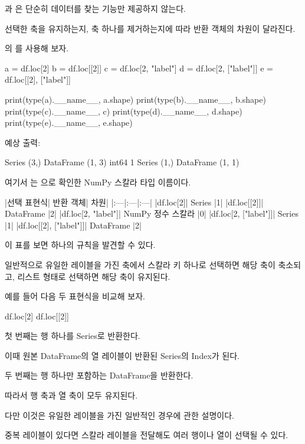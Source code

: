 과 은 단순히 데이터를 찾는 기능만 제공하지 않는다.

선택한 축을 유지하는지, 축 하나를 제거하는지에 따라 반환 객체의 차원이 달라진다.

의 를 사용해 보자.

\begin{dhkcode}
a = df.loc[2]
b = df.loc[[2]]
c = df.loc[2, "label"]
d = df.loc[2, ["label"]]
e = df.loc[[2], ["label"]]

print(type(a).__name__, a.shape)
print(type(b).__name__, b.shape)
print(type(c).__name__, c)
print(type(d).__name__, d.shape)
print(type(e).__name__, e.shape)
\end{dhkcode}

예상 출력:

\begin{dhkzsh}
Series (3,)
DataFrame (1, 3)
int64 1
Series (1,)
DataFrame (1, 1)
\end{dhkzsh}

여기서 는 으로 확인한 NumPy 스칼라 타입 이름이다.

\begin{dhktable}
|선택 표현식|	반환 객체|	차원|
|:---|:---|:---|
|df.loc[2]|	Series	|1|
|df.loc[[2]]|	DataFrame	|2|
|df.loc[2, "label"]|	NumPy 정수 스칼라	|0|
|df.loc[2, ["label"]]|	Series	|1|
|df.loc[[2], ["label"]]|	DataFrame	|2|
\end{dhktable}

이 표를 보면 하나의 규칙을 발견할 수 있다.

일반적으로 유일한 레이블을 가진 축에서 스칼라 키 하나로 선택하면 해당 축이 축소되고, 리스트 형태로 선택하면 해당 축이 유지된다.

예를 들어 다음 두 표현식을 비교해 보자.

\begin{dhkcode}
df.loc[2]
df.loc[[2]]
\end{dhkcode}

첫 번째는 행 하나를 Series로 반환한다.

이때 원본 DataFrame의 열 레이블이 반환된 Series의 Index가 된다.

두 번째는 행 하나만 포함하는 DataFrame을 반환한다.

따라서 행 축과 열 축이 모두 유지된다.

다만 이것은 유일한 레이블을 가진 일반적인 경우에 관한 설명이다.

중복 레이블이 있다면 스칼라 레이블을 전달해도 여러 행이나 열이 선택될 수 있다.

